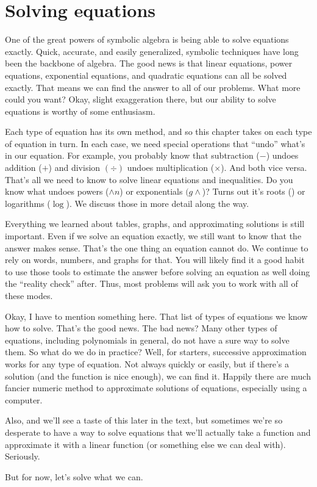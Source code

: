 

\chapter{Solving equations}

One of the great powers of symbolic algebra is being able to solve equations exactly.  Quick, accurate, and easily generalized, symbolic techniques have long been the backbone of algebra.  The good news is that linear equations, power equations, exponential equations, and quadratic equations can all be solved exactly. That means we can find the answer to all of our problems.  What more could you want?  Okay, slight exaggeration there, but our ability to solve equations is worthy of some enthusiasm.

Each type of equation has its own method, and so this chapter takes on each type of equation in turn.  In each case, we need special operations that ``undo'' what's in our equation.  For example, you probably know that subtraction ($-$) undoes addition ($+$) and division $(\div)$ undoes multiplication ($\times$).  And both vice versa.  That's all we need to know to solve linear equations and inequalities.  Do you know what undoes powers ($\wedge n$) or exponentials $(g\wedge$)?  Turns out it's roots (\raisebox{.2em}{$\sqrt[n]{~\text{  }}$}) or logarithms ($\log$).  We discuss those in more detail along the way.   

Everything we learned about tables, graphs, and approximating solutions is still important.  Even if we solve an equation exactly, we still want to know that the answer makes sense.  That's the one thing an equation cannot do.  We continue to rely on words, numbers, and graphs for that.  You will likely find it a good habit to use those tools to estimate the answer before solving an equation as well doing the ``reality check'' after.  Thus, most problems will ask you to work with all of these modes.

Okay, I have to mention something here.  That list of types of equations we know how to solve.  That's the good news.  The bad news?  Many other types of equations, including polynomials in general, do not have a sure way to solve them.  So what do we do in practice?  Well, for starters, successive approximation works for any type of equation.  Not always quickly or easily, but if there's a solution (and the function is nice enough), we can find it.  Happily there are much fancier numeric method to approximate solutions of equations, especially using a computer.  

Also, and we'll see a taste of this later in the text, but sometimes we're so desperate to have a way to solve equations that we'll actually take a function and approximate it with a linear function (or something else we can deal with).  Seriously.  

But for now, let's solve what we can.
